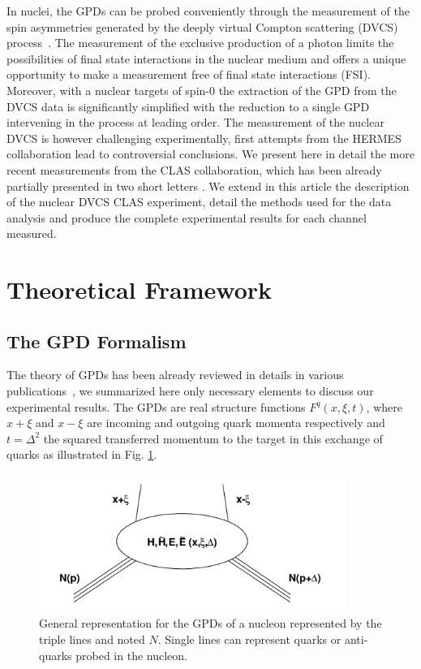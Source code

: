 \documentclass[aps,prc,preprint,superscriptaddress]{revtex4}
\begin{document}
In nuclei, the GPDs can be probed conveniently through the measurement of the
spin asymmetries generated by the deeply virtual Compton scattering (DVCS) 
process~\cite{Diehl:2003ny,Belitsky:2005qn,Boffi:2007yc,Guidal:2013rya}. The measurement of the exclusive
production of a photon limits the possibilities of final state interactions in the nuclear 
medium and offers a unique opportunity to make a measurement free of final state interactions 
(FSI). Moreover, with a nuclear targets of spin-0 the extraction of the GPD from the DVCS data 
is significantly simplified with the reduction to a single GPD intervening in the process at leading order. The 
measurement of the nuclear DVCS is however challenging experimentally, first attempts from 
the HERMES collaboration \cite{Airapetian:2009cga} lead to controversial conclusions. We present here
in detail the more recent measurements from the CLAS collaboration, which has been already partially presented
in two short letters \cite{Hattawy:2017woc,Hattawy:2018liu}. We extend in this article 
the description of the nuclear DVCS CLAS experiment, detail the methods used for the
data analysis and produce the complete experimental results for each channel measured.


\section{Theoretical Framework}

\subsection{The GPD Formalism}

The theory of GPDs has been already reviewed in details in various 
publications~\cite{Diehl:2003ny,Belitsky:2005qn,Boffi:2007yc,Guidal:2013rya},
we summarized here only necessary elements to discuss our experimental results.
The GPDs are real structure functions $F^{q}(x,\xi,t)$, where $x+\xi$ and $x-\xi$ are incoming and outgoing quark momenta 
respectively and $t=\Delta^2$ the squared transferred momentum to the target in this exchange of quarks as illustrated in 
Fig. \ref{fig:GPD}. 

\begin{figure}[tbp!]
\center
\includegraphics[width=10.0cm]{fig1/GPD.png}
\caption{General representation for the GPDs of a nucleon represented by the triple lines and noted $N$.
	Single lines can represent quarks or anti-quarks probed in the nucleon.}
\label{fig:GPD}
\end{figure}
\end{document}
